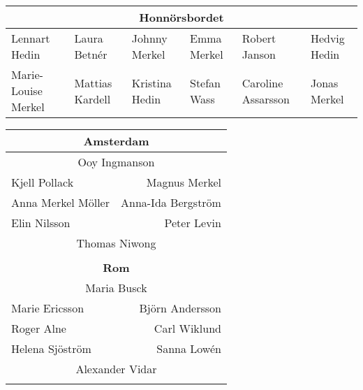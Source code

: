 \documentclass[a5paper]{article}
\begin{document}
	\thispagestyle{empty}

	\begingroup
	\fontsize{10pt}{10.3pt}\selectfont

	\begin{landscape}
		
	\begin{center}											
		\begin{tabular}{  l l l l l l}											
			\multicolumn{6}{c}{\textbf{Honnörsbordet}} \\ \hline											
			\rule{0pt}{2ex}Lennart Hedin	&	Laura Betnér	&	Johnny Merkel	&	Emma Merkel	&	Robert Janson	&	Hedvig Hedin	\\
			Marie-Louise Merkel	&	Mattias Kardell	&	Kristina Hedin	&	Stefan Wass	&	Caroline Assarsson	&	Jonas Merkel	\\ \hline
		\end{tabular}											
	\end{center}											
	
	
	\begin{center}												
		\begin{tabular}{  l r }												
			\multicolumn{2}{c}{\textbf{Amsterdam			}} \\ \hline								
			\multicolumn{2}{c}{\rule{0pt}{2ex}	Ooy Ingmanson			}   \\								
			Kjell Pollack	&	Magnus Merkel	\\								
			Anna Merkel Möller	&	Anna-Ida Bergström	\\								
			Elin Nilsson	&	Peter Levin	\\								
			\multicolumn{2}{c}{	Thomas Niwong			}   \\								
			\\								
			
			\multicolumn{2}{c}{\textbf{Rom			}} \\ \hline								
			\multicolumn{2}{c}{\rule{0pt}{2ex}	Maria Busck			}   \\								
			Marie Ericsson	&	Björn Andersson	\\								
			Roger Alne	&	Carl Wiklund	\\								
			Helena Sjöström	&	Sanna Lowén	\\								
			\multicolumn{2}{c}{	Alexander Vidar			}   \\								
			\\								
			

\end{tabular}
\end{center}
\end{landscape}
\end{document}
